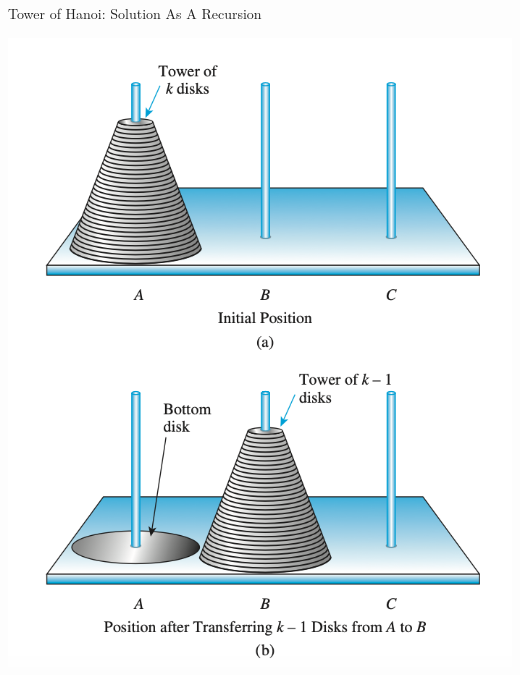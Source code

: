 \documentclass[10pt]{beamer}
\begin{document}
	
\begin{frame}{Tower of Hanoi: Solution As A Recursion}
    \centering
    \begin{minipage}{0.48\textwidth}
        \centering
        \includegraphics[width=\textwidth]{images/tower_of_hanoi_solution_1}
    \end{minipage}
    \hfill
    \begin{minipage}{0.48\textwidth}
        \centering

\end{minipage}
\end{frame}
\end{document}
